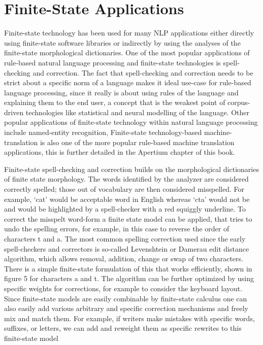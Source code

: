 \documentclass[free]{flammie}
\begin{document}
\section{Finite-State Applications}

Finite-state technology has been used for many NLP applications either directly using
finite-state software libraries or indirectly by using the analyses of the finite-state
morphological dictionaries. One of the most popular applications of rule-based natural
language processing and finite-state technologies is spell-checking and correction. The fact
that spell-checking and correction needs to be strict about a specific norm of a language
makes it ideal use-case for rule-based language processing, since it really is about using
rules of the language and explaining them to the end user, a concept that is the weakest
point of corpus-driven technologies like statistical and neural modelling of the language.
Other popular applications of finite-state technology within natural language processing
include named-entity recognition, Finite-state technology-based machine-translation is
also one of the more popular rule-based machine translation applications, this is further
detailed in the Apertium chapter of this book.

Finite-state spell-checking and correction builds on the morphological dictionaries of
finite state morphology. The words identified by the analyzer are considered correctly
spelled; those out of vocabulary are then considered misspelled. For example, ‘cat’ would
be acceptable word in English whereas ‘cta’ would not be and would be highlighted by a
spell-checker with a red squiggly underline. To correct the misspelt word-form a finite state
model can be applied, that tries to undo the spelling errors, for example, in this case to
reverse the order of characters t and a. The most common spelling correction used since
the early spell-checkers and correctors is so-called Levenshtein or Damerau edit distance
algorithm, which allows removal, addition, change or swap of two characters. There is a
simple finite-state formulation of this that works efficiently, shown in figure 5 for
characters a and t. The algorithm can be further optimized by using specific weights for
corrections, for example to consider the keyboard layout. Since finite-state models are
easily combinable by finite-state calculus one can also easily add various arbitrary and
specific correction mechanisms and freely mix and match them. For example, if writers
make mistakes with specific words, suffixes, or letters, we can add and reweight them as
specific rewrites to this finite-state model
\end{document}
